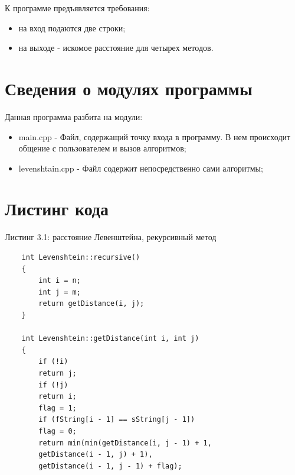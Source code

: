 \documentclass[12pt,a4paper]{report}
\begin{document}
К программе предъявляется требования:

\begin{itemize}
    \item на вход подаются две строки;
    \item на выходе - искомое расстояние для четырех методов.
\end{itemize} 


\section{Сведения о модулях программы}

Данная программа разбита на модули:

\begin{itemize}
	\item main.cpp - Файл, содержащий точку входа в программу. В нем происходит общение с пользователем и вызов алгоритмов;
	\item levenshtain.cpp - Файл содержит непосредственно сами алгоритмы;
\end{itemize}

\section{Листинг кода}



\textrm{Листинг 3.1: расстояние Левенштейна, рекурсивный метод}
	

\begin{verbatim}
	int Levenshtein::recursive()
	{	
		int i = n;
		int j = m;
		return getDistance(i, j);
	}
	
	int Levenshtein::getDistance(int i, int j)
	{
		if (!i)
		return j;
		if (!j)
		return i;
		flag = 1;
		if (fString[i - 1] == sString[j - 1])
		flag = 0;
		return min(min(getDistance(i, j - 1) + 1,
		getDistance(i - 1, j) + 1),
		getDistance(i - 1, j - 1) + flag);
\end{verbatim}
\end{document}
